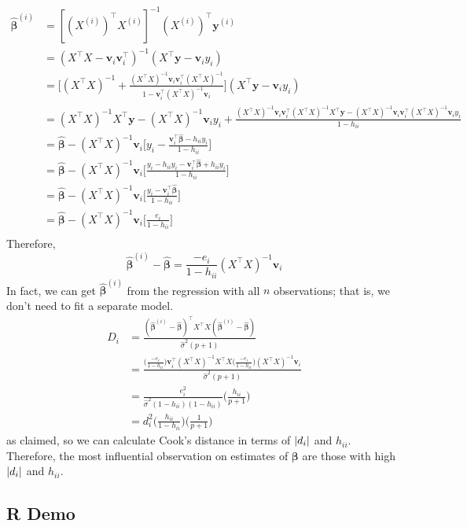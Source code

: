 \begin{align*}
      \hat{\symbf{\beta}}^{(i)}
       & =[(X^{(i)})^\top
      X^{(i)}]^{-1}(X^{(i)})^\top \symbf{y}^{(i)}                                                  \\
       & =(X^\top X-\symbf{v}_i\symbf{v}_i^\top)^{-1}(X^\top \symbf{y}-
      \symbf{v}_i y_i)                                                                             \\
       & =\biggl[(X^\top X)^{-1}+\frac{(X^\top X)^{-1}\symbf{v}_i\symbf{v}_i^\top
                  (X^\top X)^{-1}}{1-\symbf{v}_i^\top (X^\top X)^{-1}\symbf{v}_i} \biggr]
      (X^\top \symbf{y}-\symbf{v}_i y_i)                                                           \\
       & =(X^\top X)^{-1}X^\top\symbf{y}-(X^\top X)^{-1}\symbf{v}_i y_i+
      \frac{(X^\top X)^{-1}\symbf{v}_i\symbf{v}_i^\top (X^\top X)^{-1}X^\top\symbf{y}
      -(X^\top X)^{-1}\symbf{v}_i\symbf{v}_i^\top(X^\top X)^{-1}\symbf{v}_i y_i
      }{1-h_{ii}}                                                                                  \\
       & =\hat{\symbf{\beta}}-(X^\top X)^{-1}\symbf{v}_i
      \biggl[y_i-\frac{\symbf{v}_i^\top\hat{\symbf{\beta}}-h_{ii}y_i}{1-h_{ii}} \biggr]            \\
       & =\hat{\symbf{\beta}}-(X^\top X)^{-1}\symbf{v}_i
      \biggl[\frac{y_i-h_{ii}y_i-\symbf{v}_i^\top \hat{\symbf{\beta}}+h_{ii}y_i}{1-h_{ii}} \biggr] \\
       & =\hat{\symbf{\beta}}-(X^\top X)^{-1}\symbf{v}_i
      \biggl[\frac{y_i-\symbf{v}_i^\top \hat{\symbf{\beta}}}{1-h_{ii}} \biggr]                     \\
       & =\hat{\symbf{\beta}}-(X^\top X)^{-1}\symbf{v}_i
      \biggl[\frac{e_i}{1-h_{ii}} \biggr]                                                          \\
\end{align*}
Therefore,
\[ \hat{\symbf{\beta}}^{(i)}-\hat{\symbf{\beta}}=
      \frac{-e_i}{1-h_{ii}}(X^\top X)^{-1}\symbf{v}_i  \]
In fact, we can get $  \hat{\symbf{\beta}}^{(i)} $
from the regression with all $ n $ observations;
that is, we don't need to fit a separate model.
\begin{align*}
      D_i
       & =\frac{(\hat{\symbf{\beta}}^{(i)}-\hat{\symbf{\beta}})^{\top}
            X^\top X(\hat{\symbf{\beta}}^{(i)}-\hat{\symbf{\beta}})}{
      \hat{\sigma}^2(p+1) }                                            \\
       & =\frac{\displaystyle \biggl(\frac{-e_i}{1-h_{ii}} \biggr)
            \symbf{v}_i^\top (X^\top X)^{-1}X^\top X
            \biggl(\frac{-e_i}{1-h_{ii}} \biggr)(X^\top X)^{-1}\symbf{v}_i}{
            \hat{\sigma}^2(p+1)
      }                                                                \\
       & =\frac{e_i^2}{\hat{\sigma}^2(1-h_{ii})(1-h_{ii})}
      \biggl(\frac{h_{ii}}{p+1} \biggr)                                \\
       & =d_i^2\biggl(\frac{h_{ii}}{1-h_{ii}} \biggr)
      \biggl(\frac{1}{p+1} \biggr)
\end{align*}
as claimed, so we can calculate Cook's distance in terms of
$ \lvert d_i\rvert $ and $ h_{ii} $. Therefore, the most influential
observation on estimates of $ \symbf{\beta} $
are those with high $ \lvert d_i\rvert $ and $ h_{ii} $.
\subsection{R Demo}

